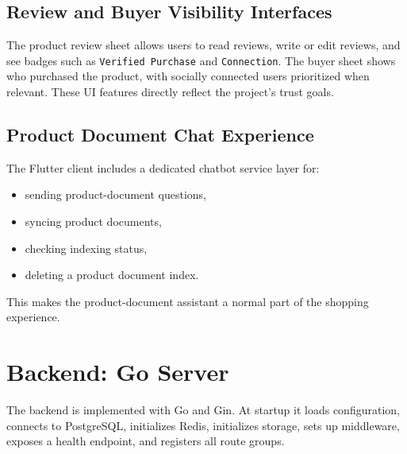 \documentclass[12pt,letterpaper]{report}
\begin{document}
\subsection{Review and Buyer Visibility Interfaces}

The product review sheet allows users to read reviews, write or edit reviews, and see badges such as \texttt{Verified Purchase} and \texttt{Connection}. The buyer sheet shows who purchased the product, with socially connected users prioritized when relevant. These UI features directly reflect the project's trust goals.


\subsection{Product Document Chat Experience}

The Flutter client includes a dedicated chatbot service layer for:

\begin{itemize}
  \item sending product-document questions,
  \item syncing product documents,
  \item checking indexing status,
  \item deleting a product document index.
\end{itemize}

This makes the product-document assistant a normal part of the shopping experience.


\section{Backend: Go Server}

The backend is implemented with Go and Gin. At startup it loads configuration, connects to PostgreSQL, initializes Redis, initializes storage, sets up middleware, exposes a health endpoint, and registers all route groups.
\end{document}
